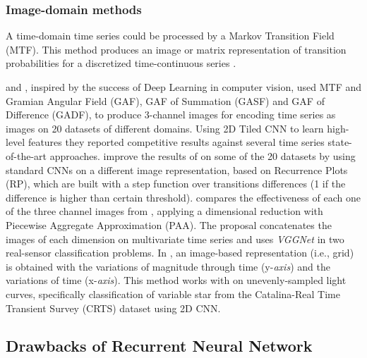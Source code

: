 \subsubsection{Image-domain methods} %
A time-domain time series could be processed by a Markov Transition Field (MTF). This method produces an image or matrix representation of transition probabilities for a discretized time-continuous series \citep{wang2015encoding}. %

\citep{wang2015imaging} and \citep{wang2015encoding}, inspired by the success of Deep Learning in computer vision, used MTF and Gramian Angular Field (GAF), GAF of Summation (GASF) and GAF of Difference (GADF), to produce 3-channel images for encoding time series as images %
on 20 datasets of different domains. Using 2D Tiled CNN to learn high-level features they reported competitive results against several time series state-of-the-art approaches.
\citep{hatami2018classification} improve the results of \citep{wang2015imaging} on some of the 20 datasets by using standard CNNs on a different image representation, based on Recurrence Plots (RP), which are built with a step function over transitions differences (1 if the difference is higher than certain threshold). %
\citep{yang2020sensor} compares the effectiveness of each one of the three channel images from \citep{wang2015imaging}, applying a dimensional reduction with Piecewise Aggregate Approximation (PAA). The proposal concatenates the images of each dimension on multivariate time series and uses \textit{VGGNet} \citep{simonyan2014very} in two real-sensor classification problems.
In \citep{mahabal2017deep}, an image-based representation (i.e., grid) is obtained with the variations of magnitude through time (y-\textit{axis}) and the variations of time (x-\textit{axis}). This method works with on unevenly-sampled light curves, specifically classification of variable star from the Catalina-Real Time Transient Survey (CRTS) dataset using 2D CNN.



\subsection{Drawbacks of Recurrent Neural Network}

